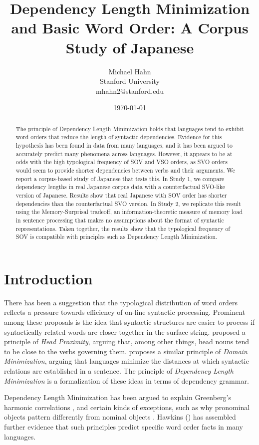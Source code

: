 \documentclass[11pt,a4paper]{article}
\title{Dependency Length Minimization and Basic Word Order: A Corpus Study of Japanese}
\author{Michael Hahn \\ Stanford University \\ mhahn2@stanford.edu}
\date{\today}
\begin{document}
\maketitle
\begin{abstract}
The principle of Dependency Length Minimization holds that languages tend to exhibit word orders that reduce the length of syntactic dependencies.
Evidence for this hypothesis has been found in data from many languages, and it has been argued to accurately predict many phenomena across languages.
However, it appears to be at odds with the high typological frequency of SOV and VSO orders, as SVO orders would seem to provide shorter dependencies between verbs and their arguments.
We report a corpus-based study of Japanese that tests this.
In Study 1, we compare dependency lengths in real Japanese corpus data with a counterfactual SVO-like version of Japanese.
Results show that real Japanese with SOV order has shorter dependencies than the counterfactual SVO version.
In Study 2, we replicate this result using the Memory-Surprisal tradeoff, an information-theoretic measure of memory load in sentence processing that makes no assumptions about the format of syntactic representations. 
Taken together, the results show that the typological frequency of SOV is compatible with principles such as Dependency Length Minimization.
\end{abstract}


\section{Introduction}

There has been a suggestion that the typological distribution of word orders reflects a pressure towards efficiency of on-line syntactic processing.
Prominent among these proposals is the idea that syntactic structures are easier to process if syntactically related words are closer together in the surface string.
\cite{rijkhoff-word-1986} proposed a principle of \emph{Head Proximity}, arguing that, among other things, head nouns tend to be close to the verbs governing them.
\cite{hawkins2014crosslinguistic} proposes a similar principle of \emph{Domain Minimization}, arguing that languages minimize the distances at which syntactic relations are established in a sentence.
The principle of \emph{Dependency Length Minimization} \citep{temperley2018minimizing} is a formalization of these ideas in terms of dependency grammar.

Dependency Length Minimization has been argued to explain Greenberg's harmonic correlations \citep{rijkhoff-word-1986, hawkins1994performance}, and certain kinds of exceptions, such as why pronominal objects pattern differently from nominal objects \citep{dryer1992greenbergian}.
Hawkins (\citep{hawkins2004efficiency, hawkins2007processing, hawkins2014crosslinguistic}) has assembled further evidence that such principles predict specific word order facts in many languages.
\end{document}
